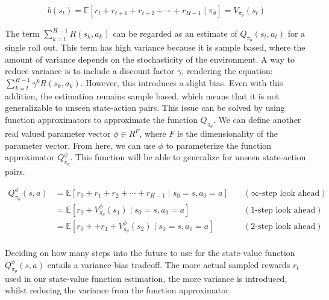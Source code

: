 \documentclass{../main.tex}{}
\begin{document}
\begin{equation}\label{equation:baseline-state-dependent}
\begin{aligned}
    b(s_t) = \mathbb{E}[r_t + r_{t+1} + r_{t+2} + \cdots + r_{H-1} \mid \pi_{\theta}] = V_{\pi_{\theta}}(s_t)
\end{aligned}
\end{equation}

The term $\sum_{k=t}^{H-1}R(s_k, a_k)$ can be regarded as an estimate of $Q_{\pi_{\theta}}(s_t, a_t)$ for a single roll out. This term has high variance because it is sample based, where the amount of variance depends on the stochasticity of the environment. A way to reduce variance is to include a discount factor $\gamma$, rendering the equation: $\sum_{k=t}^{H-1} \gamma^k  R(s_k, a_k)$. However, this introduces a slight bias. Even with this addition, the estimation remains sample based, which means that it is not generalizable to unseen state-action pairs. This issue can be solved by using function approximators to approximate the function $Q_{\pi_{\theta}}$. We can define another real valued parameter vector $\phi \in R^F$, where $F$ is the dimensionality of the parameter vector. From here, we can use $\phi$ to parameterize the function approximator $Q^{\phi}_{\pi_{\theta}}$. This function will be able to generalize for unseen state-action pairs. 

\begin{equation}
\label{equation:q-n-step-lookahead}
\begin{aligned}
Q^{\phi}_{\pi_{\theta}}(s,a) & = \mathbb{E}[r_0 + r_1 + r_2 + \cdots + r_{H-1} \mid s_0 = s, a_0 = a] \quad & (\infty\text{-step look ahead}) \\
                      & = \mathbb{E}[r_0 + V^{\phi}_{\pi_{\theta}}(s_1) \mid s_0 = s, a_0 = a] \quad & (1\text{-step look ahead}) \\
                      & = \mathbb{E}[r_0 + + r_1 + V^{\phi}_{\pi_{\theta}}(s_2) \mid s_0 = s, a_0 = a] \quad & (2\text{-step look ahead}) \\
\end{aligned}
\end{equation}

Deciding on how many steps into the future to use for the state-value function $Q_{\pi_{\theta}}^{\phi}(s, a)$ entails a variance-bias tradeoff. The more actual sampled rewards $r_t$ used in our state-value function estimation, the more variance is introduced, whilst reducing the variance from the function approximator.
\end{document}
